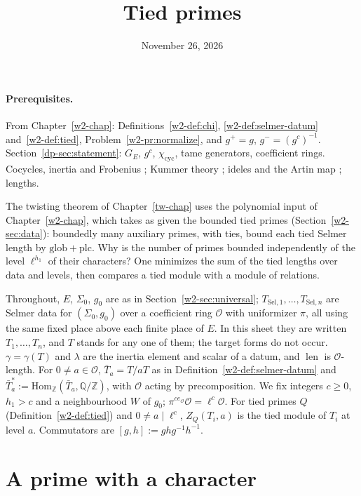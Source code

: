 \documentclass[reqno]{amsart}
\title{Tied primes}
\author{}
\date{November 26, 2026}
\newcounter{chap}
\theoremstyle{definition}
\theoremstyle{plain}
\newcommand{\Z}{\mathbb{Z}}
\newcommand{\Q}{\mathbb{Q}}
\newcommand{\Oc}{\mathcal{O}}
\newcommand{\len}{\operatorname{len}}
\newcommand{\cyc}{\chi_{\mathrm{cyc}}}
\begin{document}
\maketitle
{}\label{chap}

\paragraph{Prerequisites.}
From Chapter~\ref{w2-chap}: Definitions~\ref{w2-def:chi}, \ref{w2-def:selmer-datum} and~\ref{w2-def:tied}, Problem~\ref{w2-pr:normalize}, and \(g^{+} = g\), \(g^{-} = (g^c)^{-1}\).  Section~\ref{dp-sec:statement}: \(G_E\), \(g^c\), \(\cyc\), tame generators, coefficient rings.  Cocycles, inertia and Frobenius \cite[Ch.~I, IV, VII]{SLF}; Kummer theory \cite[Ch.~IV, \S3]{Ne}; ideles and the Artin map \cite[Ch.~VI]{Ne}; lengths.

\medskip
The twisting theorem of Chapter~\ref{tw-chap} uses the polynomial input of Chapter~\ref{w2-chap}, which takes as given the bounded tied primes (Section~\ref{w2-sec:data}): boundedly many auxiliary primes, with ties, bound each tied Selmer length by \(\mathrm{glob} + \mathrm{plc}\).  Why is the number of primes bounded independently of the level \(\ell^{h_1}\) of their characters?  One minimizes the sum of the tied lengths over data and levels, then compares a tied module with a module of relations.

Throughout, \(E\), \(\Sigma_0\), \(g_0\) are as in Section~\ref{w2-sec:universal}; \(T_{\mathrm{Sel},1}, \dots, T_{\mathrm{Sel},n}\) are Selmer data for \((\Sigma_0, g_0)\) over a coefficient ring \(\Oc\) with uniformizer \(\pi\), all using the same fixed place above each finite place of \(E\).  In this sheet they are written \(T_1, \dots, T_n\), and \(T\) stands for any one of them; the target forms do not occur.  \(\gamma = \gamma(T)\) and \(\lambda\) are the inertia element and scalar of a datum, and \(\len\) is \(\Oc\)-length.  For \(0 \ne a \in \Oc\), \(\bar T_a = T/aT\) as in Definition~\ref{w2-def:selmer-datum} and \(\bar T_a^{*} := \mathrm{Hom}_{\Z}(\bar T_a, \Q/\Z)\), with \(\Oc\) acting by precomposition.  We fix integers \(c \ge 0\), \(h_1 > c\) and a neighbourhood \(W\) of \(g_0\); \(\pi^{ce_{\Oc}}\Oc = \ell^c\Oc\).  For tied primes \(Q\) (Definition~\ref{w2-def:tied}) and \(0 \ne a \mid \ell^c\), \(Z_Q(T_i, a)\) is the tied module of \(T_i\) at level \(a\).  Commutators are \([g, h] := ghg^{-1}h^{-1}\).

\section{A prime with a character}\label{sec:prime}
\end{document}

